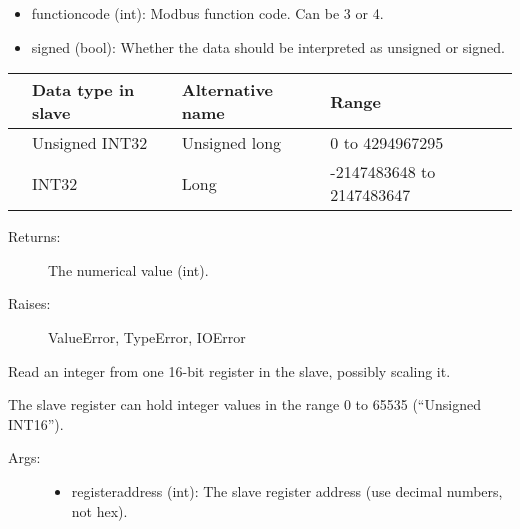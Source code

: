 \documentclass[letterpaper,10pt,english]{sphinxmanual}
\begin{document}
\begin{fulllineitems}
\begin{fulllineitems}
\begin{description}
\begin{itemize}
\item {} 
functioncode (int): Modbus function code. Can be 3 or 4.

\item {} 
signed (bool): Whether the data should be interpreted as unsigned or signed.

\end{itemize}

\end{description}

\noindent\begin{tabulary}{\linewidth}{|L|L|L|L|}
\hline
\textsf{\relax 
{}
\unskip}\relax &\textsf{\relax 
Data type in slave
\unskip}\relax &\textsf{\relax 
Alternative name
\unskip}\relax &\textsf{\relax 
Range
\unskip}\relax \\
\hline
{}
&
Unsigned INT32
&
Unsigned long
&
0 to 4294967295
\\
\hline
{}
&
INT32
&
Long
&
-2147483648 to 2147483647
\\
\hline\end{tabulary}

\begin{description}
\item[{Returns:}] \leavevmode
The numerical value (int).

\item[{Raises:}] \leavevmode
ValueError, TypeError, IOError

\end{description}

\end{fulllineitems}


\begin{fulllineitems}
\label{minimalmodbus:minimalmodbus.Instrument.read_register}
Read an integer from one 16-bit register in the slave, possibly scaling it.

The slave register can hold integer values in the range 0 to 65535 (``Unsigned INT16'').
\begin{description}
\item[{Args:}] \leavevmode\begin{itemize}
\item {} 
registeraddress (int): The slave register address (use decimal numbers, not hex).


\end{itemize}
\end{description}
\end{fulllineitems}
\end{fulllineitems}
\end{document}
